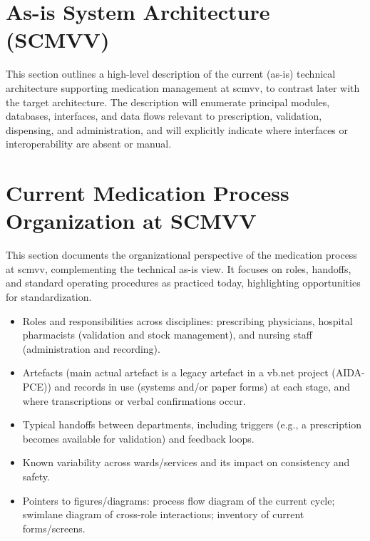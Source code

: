 \section{As-is System Architecture (SCMVV)}
\label{sec:as_is_architecture}

This section outlines a high-level description of the current (as-is) technical architecture supporting medication management at \gls{scmvv}, to contrast later with the target architecture. The description will enumerate principal modules, databases, interfaces, and data flows relevant to prescription, validation, dispensing, and administration, and will explicitly indicate where interfaces or interoperability are absent or manual.

\section{Current Medication Process Organization at SCMVV}
\label{sec:current_process_org}

This section documents the organizational perspective of the medication process at \gls{scmvv}, complementing the technical as-is view. It focuses on roles, handoffs, and standard operating procedures as practiced today, highlighting opportunities for standardization.

\begin{itemize}
    \item Roles and responsibilities across disciplines: prescribing physicians, hospital pharmacists (validation and stock management), and nursing staff (administration and recording).
    \item Artefacts (main actual artefact is a legacy artefact in a vb.net project (AIDA-PCE)) and records in use (systems and/or paper forms) at each stage, and where transcriptions or verbal confirmations occur.
    \item Typical handoffs between departments, including triggers (e.g., a prescription becomes available for validation) and feedback loops.
    \item Known variability across wards/services and its impact on consistency and safety.
    \item Pointers to figures/diagrams: process flow diagram of the current cycle; swimlane diagram of cross-role interactions; inventory of current forms/screens.
\end{itemize}

